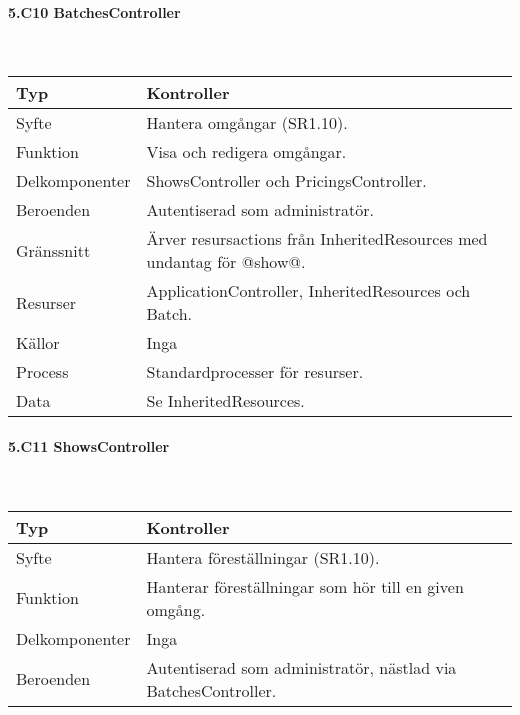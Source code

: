 \documentclass[a4paper, twoside, 11pt, titlepage]{article}
\begin{document}
			\paragraph{5.C10 BatchesController}\

			\begin {table} [ht] \begin{tabular} {  p{3.5cm} p{9.6cm} }
				\hline
				Typ & Kontroller  \\
				\hline
				Syfte & Hantera omgångar (SR1.10).  \\
				\hline
				Funktion & Visa och redigera omgångar.  \\
				\hline
				Delkomponenter & ShowsController och PricingsController.  \\
				\hline
				Beroenden & Autentiserad som administratör.  \\
				\hline
				Gränssnitt & Ärver resursactions från InheritedResources med undantag för @show@.  \\
				\hline
				Resurser & ApplicationController, InheritedResources och Batch.  \\
				\hline
				Källor & Inga  \\
				\hline
				Process & Standardprocesser för resurser.  \\
				\hline
				Data & Se InheritedResources.  \\
				\hline
			\end{tabular} \end{table} \FloatBarrier


			\paragraph{5.C11 ShowsController}\

			\begin {table} [ht] \begin{tabular} {  p{3.5cm} p{9.6cm} }
				\hline
				Typ & Kontroller  \\
				\hline
				Syfte & Hantera föreställningar (SR1.10).  \\
				\hline
				Funktion & Hanterar föreställningar som hör till en given omgång.  \\
				\hline
				Delkomponenter & Inga  \\
				\hline
				Beroenden & Autentiserad som administratör, nästlad via BatchesController.  \\
				\hline
			\end{tabular} \end{table} \FloatBarrier
			\vspace{6mm}
\end{document}
